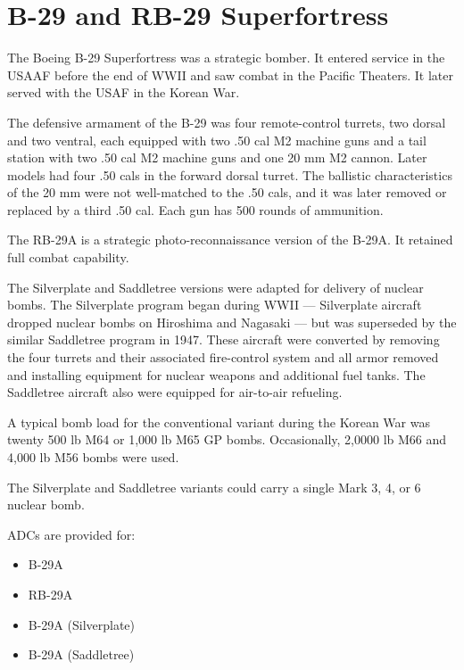 \section*{B-29 and RB-29 Superfortress}

The Boeing B-29 Superfortress was a strategic bomber. It entered service in the USAAF before the end of WWII and saw combat in the Pacific Theaters. It later served with the USAF in the Korean War.

The defensive armament of the B-29 was four remote-control turrets, two dorsal and two ventral, each equipped with two .50 cal M2 machine guns and a tail station with two .50 cal M2 machine guns and one 20 mm M2 cannon. Later models had four .50 cals in the forward dorsal turret. The ballistic characteristics of the 20 mm were not well-matched to the .50 cals, and it was later removed or replaced by a third .50 cal. Each gun has 500 rounds of ammunition. 

The RB-29A is a strategic photo-reconnaissance version of the B-29A. It retained full combat capability.

The Silverplate and Saddletree versions were adapted for delivery of nuclear bombs.  The Silverplate program began during WWII --- Silverplate aircraft dropped nuclear bombs on Hiroshima and Nagasaki --- but was superseded by the similar Saddletree program in 1947. These aircraft were converted by removing the four turrets and their associated fire-control system and all armor removed and installing equipment for nuclear weapons and additional fuel tanks. The Saddletree aircraft also were equipped for air-to-air refueling.

A typical bomb load for the conventional variant during the Korean War was twenty 500 lb M64 or 1,000 lb M65 GP bombs. Occasionally, 2,0000 lb M66 and 4,000 lb M56 bombs were used. 

The Silverplate and Saddletree variants could carry a single Mark 3, 4, or 6 nuclear bomb.

ADCs are provided for:
\begin{itemize}
\item B-29A
\item RB-29A
\item B-29A (Silverplate)
\item B-29A (Saddletree)
\end{itemize}
